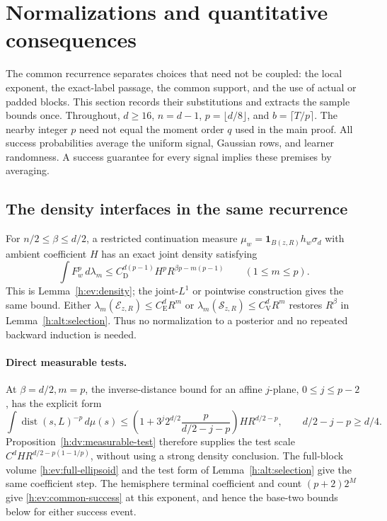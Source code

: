 \section{Normalizations and quantitative consequences}
\label{h:dv:applications}

The common recurrence separates choices that need not be coupled:
the local exponent, the exact-label passage, the common support,
and the use of actual or padded blocks. This section records their
substitutions and extracts the sample bounds once.
Throughout, \(d\ge16\), \(n=d-1\), \(p=\lfloor d/8\rfloor\), and
\(b=\lceil T/p\rceil\). The nearby integer \(p\) need not equal the
moment order \(q\) used in the main proof. All success probabilities
average the uniform signal, Gaussian rows, and learner randomness.
A success guarantee for every signal implies these premises by averaging.

\subsection{The density interfaces in the same recurrence}

For \(n/2\le\beta\le d/2\), a restricted continuation measure
\(\mu_w=\mathbf1_{B(z,R)}h_w\sigma_d\) with ambient coefficient \(H\)
has an exact joint density satisfying
\begin{equation}\label{h:dv:application-moment}
 \int F_w^p\,d\lambda_m
 \le C_{\mathrm D}^{d(p-1)}
       H^pR^{\beta p-m(p-1)}
 \qquad(1\le m\le p).
\end{equation}
This is Lemma~\ref{h:ev:density}; the joint-\(L^1\) or pointwise
construction gives the same bound. Either
\(\lambda_m(\mathcal E_{z,R})\le C_{\mathrm E}^dR^m\) or
\(\lambda_m(\mathcal S_{z,R})\le C_{\mathrm V}^dR^m\) restores
\(R^\beta\) in Lemma~\ref{h:alt:selection}. Thus no normalization to
a posterior and no repeated backward induction is needed.

\paragraph{Direct measurable tests.}\label{h:dv:half-ambient-application}
At \(\beta=d/2,m=p\), the inverse-distance bound for an affine
\(j\)-plane, \(0\le j\le p-2\), has the explicit form
\[
 \int\operatorname{dist}(s,L)^{-p}\,d\mu(s)
 \le\left(1+3^j2^{d/2}\frac{p}{d/2-j-p}\right)
       H R^{d/2-p},
 \qquad d/2-j-p\ge d/4 .
\]
Proposition~\ref{h:dv:measurable-test} therefore supplies the test
scale \(C^dHR^{d/2-p(1-1/p)}\), without using a strong density
conclusion. The full-block volume \eqref{h:ev:full-ellipsoid} and
the test form of Lemma~\ref{h:alt:selection} give the same coefficient
step. The hemisphere terminal coefficient and count \((p+2)2^M\)
give \eqref{h:ev:common-success} at this exponent, and hence the
base-two bounds below for either success event.

